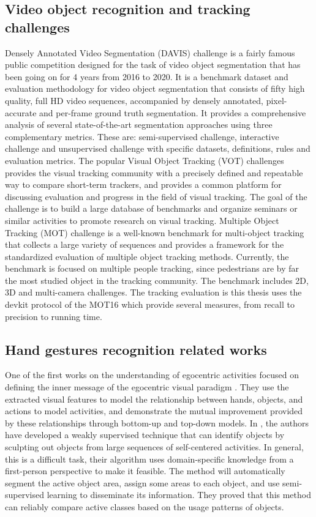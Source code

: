 \subsection{Video object recognition and tracking challenges}
Densely Annotated Video Segmentation (DAVIS) challenge \cite{7780657} is a fairly famous public competition designed for the task of video object segmentation that has been going on for 4 years from 2016 to 2020. It is a benchmark dataset and evaluation methodology for video object segmentation that consists of fifty high quality, full HD video sequences, accompanied by densely annotated, pixel-accurate and per-frame ground truth segmentation. It provides a comprehensive analysis of several state-of-the-art segmentation approaches using three complementary metrics. These are: semi-supervised challenge, interactive challenge and unsupervised challenge with specific datasets, definitions, rules and evaluation metrics.
The popular Visual Object Tracking (VOT) challenges \cite{VOT_TPAMI} provides the visual tracking community with a precisely defined and repeatable way to compare short-term trackers, and provides a common platform for discussing evaluation and progress in the field of visual tracking. The goal of the challenge is to build a large database of benchmarks and organize seminars or similar activities to promote research on visual tracking.
Multiple Object Tracking (MOT) \cite{DBLP:journals/corr/MilanL0RS16} challenge is a well-known benchmark for multi-object tracking that collects a large variety of sequences and provides a framework for the standardized evaluation of multiple object tracking methods. Currently, the benchmark is focused on multiple people tracking, since pedestrians are by far the most studied object in the tracking community. The benchmark includes 2D, 3D and multi-camera challenges. The tracking evaluation is this thesis uses the devkit protocol of the MOT16 which provide several measures, from recall to precision to running time. 
\subsection{Hand gestures recognition related works}
One of the first works on the understanding of egocentric activities focused on defining the inner message of the egocentric visual paradigm \cite{10.1109/ICCV.2011.6126269}. They use the extracted visual features to model the relationship between hands, objects, and actions to model activities, and demonstrate the mutual improvement provided by these relationships through bottom-up and top-down models.
In \cite{5995444}, the authors have developed a weakly supervised technique that can identify objects by sculpting out objects from large sequences of self-centered activities. In general, this is a difficult task, their algorithm uses domain-specific knowledge from a first-person perspective to make it feasible. The method will automatically segment the active object area, assign some areas to each object, and use semi-supervised learning to disseminate its information. They proved that this method can reliably compare active classes based on the usage patterns of objects.


